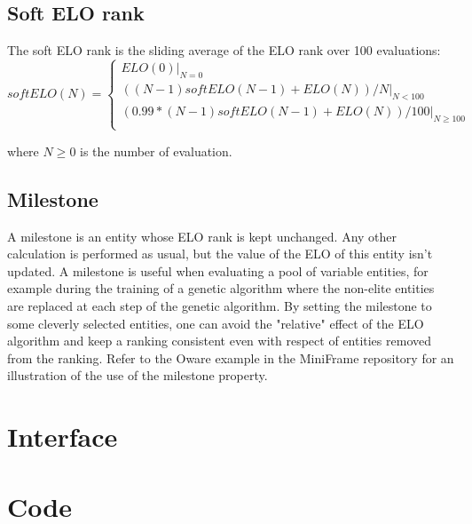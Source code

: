 \subsection{Soft ELO rank}

The soft ELO rank is the sliding average of the ELO rank over 100 evaluations:\\
\begin{equation}
softELO(N)=\left\lbrace
\begin{array}{l}
ELO(0)|_{N=0}\\
((N-1)softELO(N-1)+ELO(N))/N|_{N<100}\\
(0.99*(N-1)softELO(N-1)+ELO(N))/100|_{N\geq100}\\
\end{array}
\right.
\end{equation}

where $N\geq0$ is the number of evaluation.

\subsection{Milestone}

A milestone is an entity whose ELO rank is kept unchanged. Any other calculation is performed as usual, but the value of the ELO of this entity isn't updated. A milestone is useful when evaluating a pool of variable entities, for example during the training of a genetic algorithm where the non-elite entities are replaced at each step of the genetic algorithm. By setting the milestone to some cleverly selected entities, one can avoid the "relative" effect of the ELO algorithm and keep a ranking consistent even with respect of entities removed from the ranking. Refer to the Oware example in the MiniFrame repository for an illustration of the use of the milestone property. 

\section{Interface}

\begin{scriptsize}
\begin{ttfamily}

\end{ttfamily}
\end{scriptsize}

\section{Code}

